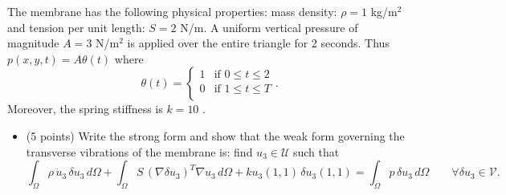 \documentclass[12pt]{article}
\begin{document}
The membrane has the following physical properties: mass density: $\rho = 1$ kg/m$^2$ and tension per unit length: $S = 2$ N/m. A uniform vertical pressure of magnitude $A = 3$ N/m$^2$ is applied over the entire triangle for 2 seconds. Thus $p(x, y, t) = A \theta(t)$ where
$$\theta(t)=\begin{cases}
		1 & \mbox{if } 0\leq t\leq 2 \\
		0 & \mbox{if } 1\leq t\leq T \\
	\end{cases}.$$
Moreover, the spring stiffness is $k = 10$ .
\begin{itemize}
	\item[(a)] (5 points) Write the strong form and show that the weak form governing the transverse vibrations of the membrane is: find \( u_3 \in \mathcal{U} \) such that
	      \[
		      \int_{\Omega} \rho \, \ddot{u}_3 \, \delta u_3 \, d\Omega + \int_{\Omega} S \, (\nabla \delta u_3)^T\nabla u_3 \, d\Omega  + k u_3(1,1)\, \delta u_3(1,1) = \int_{\Omega} p \, \delta u_3 \, d\Omega \qquad\forall \delta u_3 \in \mathcal{V}.
	      \]


\end{itemize}
\end{document}
